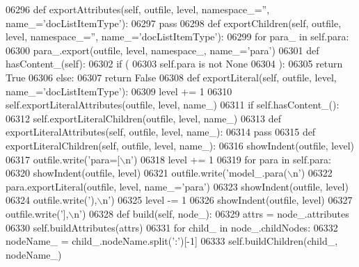 \begin{DoxyCode}
{{{{{{{{{{{{{{{{{{{{{{{{{{{{{{{{{{{{{{{{{{{{{{{{{{{{{{{{{{{{{{{{{{{{{{{{{{{{{{{{{{{{{{{{{{{{{{{{{{{{{{{{{{{{{{{{{{{{{{{{{{{{{{{{{{{{{{{{{{{{{{{{{{{{{{{{{{{{{{{{{{{{{{{{{{{{{{{{{{{{{{{{{{{{{{{{{{{{{{{{{{{{{{{{{{{{{{{{{{{{{{{{{{{{{{{{{{{{{{{{{{{{{{{{{{{{{{{{{{{{{{{{{{{{{{{{{{{{{{{{{{{{{{{{{{{{{{{{{{{{{{{{{{{{{{{{{{{{{{{{{{{{{{{{{{{{{{{{{{{{{{{{{{{{{{{{{{{{{{{{{{{{{{{{{{{{{{{{{{{{{{{{{{{{{{{{06296     \textcolor{keyword}{def }exportAttributes(self, outfile, level, namespace\_='', name\_='docListItemType'):
06297         \textcolor{keywordflow}{pass}
06298     \textcolor{keyword}{def }exportChildren(self, outfile, level, namespace\_='', name\_='docListItemType'):
06299         \textcolor{keywordflow}{for} para\_ \textcolor{keywordflow}{in} self.para:
06300             para\_.export(outfile, level, namespace\_, name\_=\textcolor{stringliteral}{'para'})
06301     \textcolor{keyword}{def }hasContent_(self):
06302         \textcolor{keywordflow}{if} (
06303             self.para \textcolor{keywordflow}{is} \textcolor{keywordflow}{not} \textcolor{keywordtype}{None}
06304             ):
06305             \textcolor{keywordflow}{return} \textcolor{keyword}{True}
06306         \textcolor{keywordflow}{else}:
06307             \textcolor{keywordflow}{return} \textcolor{keyword}{False}
06308     \textcolor{keyword}{def }exportLiteral(self, outfile, level, name\_='docListItemType'):
06309         level += 1
06310         self.exportLiteralAttributes(outfile, level, name\_)
06311         \textcolor{keywordflow}{if} self.hasContent_():
06312             self.exportLiteralChildren(outfile, level, name\_)
06313     \textcolor{keyword}{def }exportLiteralAttributes(self, outfile, level, name\_):
06314         \textcolor{keywordflow}{pass}
06315     \textcolor{keyword}{def }exportLiteralChildren(self, outfile, level, name\_):
06316         showIndent(outfile, level)
06317         outfile.write(\textcolor{stringliteral}{'para=[\(\backslash\)n'})
06318         level += 1
06319         \textcolor{keywordflow}{for} para \textcolor{keywordflow}{in} self.para:
06320             showIndent(outfile, level)
06321             outfile.write(\textcolor{stringliteral}{'model\_.para(\(\backslash\)n'})
06322             para.exportLiteral(outfile, level, name\_=\textcolor{stringliteral}{'para'})
06323             showIndent(outfile, level)
06324             outfile.write(\textcolor{stringliteral}{'),\(\backslash\)n'})
06325         level -= 1
06326         showIndent(outfile, level)
06327         outfile.write(\textcolor{stringliteral}{'],\(\backslash\)n'})
06328     \textcolor{keyword}{def }build(self, node\_):
06329         attrs = node\_.attributes
06330         self.buildAttributes(attrs)
06331         \textcolor{keywordflow}{for} child\_ \textcolor{keywordflow}{in} node\_.childNodes:
06332             nodeName\_ = child\_.nodeName.split(\textcolor{stringliteral}{':'})[-1]
06333             self.buildChildren(child\_, nodeName\_)
}}}}}}}}}}}}}}}}}}}}}}}}}}}}}}}}}}}}}}}}}}}}}}}}}}}}}}}}}}}}}}}}}}}}}}}}}}}}}}}}}}}}}}}}}}}}}}}}}}}}}}}}}}}}}}}}}}}}}}}}}}}}}}}}}}}}}}}}}}}}}}}}}}}}}}}}}}}}}}}}}}}}}}}}}}}}}}}}}}}}}}}}}}}}}}}}}}}}}}}}}}}}}}}}}}}}}}}}}}}}}}}}}}}}}}}}}}}}}}}}}}}}}}}}}}}}}}}}}}}}}}}}}}}}}}}}}}}}}}}}}}}}}}}}}}}}}}}}}}}}}}}}}}}}}}}}}}}}}}}}}}}}}}}}}}}}}}}}}}}}}}}}}}}}}}}}}}}}}}}}}}}}}}}}}}}}}}}}}}}}}}}}}}}}}}}}
\end{DoxyCode}
